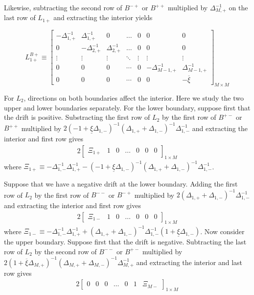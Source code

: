\documentclass[11pt]{article}
\theoremstyle{definition}
\begin{document}
Likewise, subtracting the second row of $B^{-+}$ or $B^{++}$ multiplied by $\Delta_{M,+}^{-1}$ on the last row of $L_{1+}$ and extracting the interior yields

\begin{equation}
L_{1+}^{B+} \equiv \begin{bmatrix}
-\Delta_{1,+}^{-1}&\Delta_{1,+}^{-1}&0&\dots&0&0&0\\
0&-\Delta_{2,+}^{-1}&\Delta_{2,+}^{-1}&\dots&0&0&0\\
\vdots&\vdots&\vdots&\ddots&\vdots&\vdots&\vdots\\
0&0&0&\cdots&0&-\Delta_{M-1,+}^{-1}&\Delta_{M-1,+}^{-1}\\
0&0&0&\cdots&0&0&-\overline{\xi} 
\end{bmatrix}_{M\times M} \label{eq:L-1p-irregular-right}
\end{equation}

For $L_2$, directions on both boundaries affect the interior. Here we study the two upper and lower boundaries separately. For the lower boundary, suppose first that the drift is positive. Substracting the first row of $L_2$ by the first row of $B^{+-}$ or $B^{++}$ multiplied by $2(-1 + \underline{\xi} \Delta_{1,-} )^{-1} (\Delta_{1,+} + \Delta_{1,-})^{-1}  \Delta_{1,-}^{-1} $  and extracting the interior and first row gives
\begin{align}
2\begin{bmatrix}
\Xi_{1+} &1&0&\dots&0&0&0
\end{bmatrix}_{1\times M}
\end{align}
where $\Xi_{1+} \equiv -\Delta_{1,-}^{-1} \Delta_{1,+}^{-1}  - (-1 + \underline{\xi} \Delta_{1,-})^{-1} (\Delta_{1,+} + \Delta_{1,-})^{-1}  \Delta_{1,-}^{-1}$.

Suppose that we have a negative drift at the lower boundary. Adding the first row of $L_2$ by the first row of $B^{--}$ or $B^{-+}$ multiplied by $2(\Delta_{1,+} + \Delta_{1,-} )^{-1} \Delta_{1,-}^{-1}$ and extracting the interior and first row gives
\begin{align}
2\begin{bmatrix}
\Xi_{1-} &1&0&\dots&0&0&0
\end{bmatrix}_{1\times M}
\end{align}
where $\Xi_{1-} \equiv -\Delta_{1,-}^{-1} \Delta_{1,+}^{-1}  + (\Delta_{1,+} + \Delta_{1,-} )^{-1} \Delta_{1,-}^{-1} (1 + \underline{\xi}\Delta_{1,-})$.
Now consider the upper boundary. Suppose first that the drift is negative. Subtracting the last row of $L_2$ by the second row of $B^{--}$ or $B^{+-}$ multiplied by $2(1 + \overline{\xi} \Delta_{M,+} )^{-1} (\Delta_{M,+} + \Delta_{M,-})^{-1}  \Delta_{M,+}^{-1}$ and extracting the interior and last row gives 
\begin{align}
2\begin{bmatrix}
0 &0&0&\dots&0&1&\Xi_{M-}
\end{bmatrix}_{1\times M}
\end{align}
\end{document}
